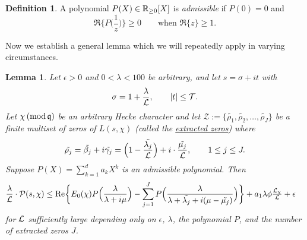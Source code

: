 \documentclass[12pt,psamsfonts]{amsart}
\newtheorem{lem}[thm]{Lemma}
\theoremstyle{definition}
\newtheorem{defn}[thm]{Definition}
\theoremstyle{remark}
\numberwithin{equation}{section}
\begin{document}
\begin{defn} \label{Admissible} A polynomial $P(X) \in \mathbb{R}_{\geq 0}[X]$ is \emph{admissible} if $P(0) = 0$ and
\[
\Re\Big\{ P\Big(\frac{1}{z}\Big) \Big\} \geq 0 \qquad \text{when $\Re\{z\} \geq 1$}. 
\]
\end{defn}

Now we establish a general lemma which we will repeatedly apply in varying circumstances. 

\begin{lem} \label{PolyEI-Apply} 
Let $\epsilon > 0$ and $0 < \lambda < 100$ be arbitrary, and let $s = \sigma + it$ with
\[
\sigma = 1 + \frac{\lambda}{\mathcal{L}}, \qquad  |t| \leq \mathcal{T}. 
\]
Let $\chi \, (\mathrm{mod} {\, \mathfrak{q}})$ be an arbitrary Hecke character and let $\mathcal{Z} := \{ \tilde{\rho_1}, \tilde{\rho_2}, \dots, \tilde{\rho_J}\}$
 be a finite multiset of zeros of $L(s,\chi)$ (called the \underline{extracted zeros}) where
 \[
 \tilde{\rho_j} = \tilde{\beta_j} + i\tilde{\gamma_j} =  \Big(1-\frac{\tilde{\lambda_j}}{\mathcal{L}}\Big) + i\cdot \frac{\tilde{\mu_j}}{\mathcal{L}}, \qquad 1 \leq j \leq J.
 \]
Suppose $P(X) = \sum_{k=1}^d a_k X^k$ is an admissible polynomial. Then
 \begin{equation*}
\begin{aligned}
\frac{\lambda}{\mathcal{L}} \cdot \mathcal{P}(s,\chi) & \leq    \mathrm{Re}\bigg\{ E_0(\chi) P\Big( \frac{\lambda}{\lambda + i\mu}\Big) - \sum_{j=1}^J  P\Big( \frac{\lambda}{\lambda + \tilde{\lambda_j} + i(\mu - \tilde{\mu_j}) } \Big) \bigg\} + a_1 \lambda \phi \tfrac{\mathcal{L}_{\chi}}{\mathcal{L}} + \epsilon
\end{aligned}
\end{equation*}
for $\mathcal{L}$ sufficiently large depending only on $\epsilon$, $\lambda$,  the polynomial $P$, and the number of extracted zeros $J$. 

\end{lem}
\end{document}
